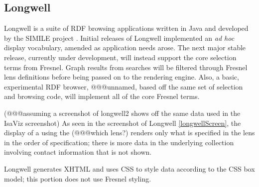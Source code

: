 \subsection{Longwell}

Longwell is a suite of RDF browsing applications written in Java and developed by the SIMILE project \cite{simile}.  Initial releases of Longwell implemented an {\em ad hoc} display vocabulary, amended as application needs arose.  The next major stable release, currently under development, will instead support the core selection terms from Fresnel.  Graph results from searches will be filtered through Fresnel lens definitions before being passed on to the rendering engine.  Also, a basic, experimental RDF browser, @@@unnamed, based off the same set of selection and browsing code, will implement all of the core Fresnel terms.

(@@@assuming a screenshot of longwell2 shows off the same data used in the IsaViz screenshot) As seen in the screenshot of Longwell \ref{longwellScreen}, the display of a  using the (@@@which lens?) renders only what is specified in the lens in the order of specification; there is more data in the underlying collection involving contact information that is not shown.

Longwell generates XHTML and uses CSS to style data according to the CSS box model; this portion does not use Fresnel styling.

